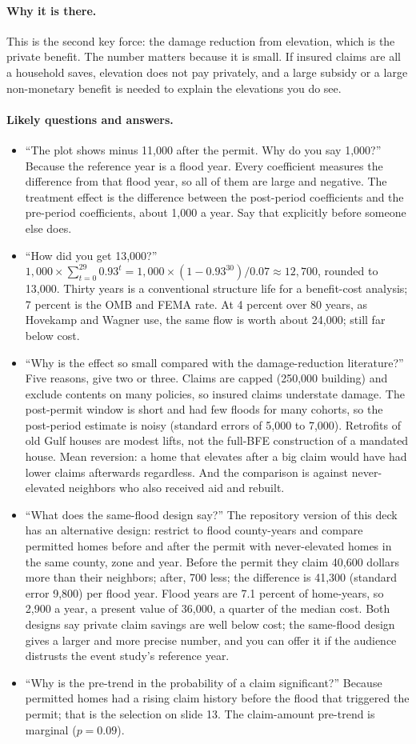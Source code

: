 \documentclass[11pt]{article}
\newcommand{\why}{\paragraph{Why it is there.}}
\newcommand{\qa}{\paragraph{Likely questions and answers.}}
\begin{document}
\why This is the second key force: the damage reduction from elevation, which is the private benefit. The number matters because it is small. If insured claims are all a household saves, elevation does not pay privately, and a large subsidy or a large non-monetary benefit is needed to explain the elevations you do see.

\qa
\begin{itemize}
\item ``The plot shows minus 11,000 after the permit. Why do you say 1,000?'' Because the reference year is a flood year. Every coefficient measures the difference from that flood year, so all of them are large and negative. The treatment effect is the difference between the post-period coefficients and the pre-period coefficients, about 1,000 a year. Say that explicitly before someone else does.
\item ``How did you get 13,000?'' $1{,}000 \times \sum_{t=0}^{29} 0.93^t = 1{,}000 \times (1-0.93^{30})/0.07 \approx 12{,}700$, rounded to 13,000. Thirty years is a conventional structure life for a benefit-cost analysis; 7 percent is the OMB and FEMA rate. At 4 percent over 80 years, as Hovekamp and Wagner use, the same flow is worth about 24,000; still far below cost.
\item ``Why is the effect so small compared with the damage-reduction literature?'' Five reasons, give two or three. Claims are capped (250,000 building) and exclude contents on many policies, so insured claims understate damage. The post-permit window is short and had few floods for many cohorts, so the post-period estimate is noisy (standard errors of 5,000 to 7,000). Retrofits of old Gulf houses are modest lifts, not the full-BFE construction of a mandated house. Mean reversion: a home that elevates after a big claim would have had lower claims afterwards regardless. And the comparison is against never-elevated neighbors who also received aid and rebuilt.
\item ``What does the same-flood design say?'' The repository version of this deck has an alternative design: restrict to flood county-years and compare permitted homes before and after the permit with never-elevated homes in the same county, zone and year. Before the permit they claim 40,600 dollars more than their neighbors; after, 700 less; the difference is 41,300 (standard error 9,800) per flood year. Flood years are 7.1 percent of home-years, so 2,900 a year, a present value of 36,000, a quarter of the median cost. Both designs say private claim savings are well below cost; the same-flood design gives a larger and more precise number, and you can offer it if the audience distrusts the event study's reference year.
\item ``Why is the pre-trend in the probability of a claim significant?'' Because permitted homes had a rising claim history before the flood that triggered the permit; that is the selection on slide 13. The claim-amount pre-trend is marginal ($p = 0.09$).
\end{itemize}
\end{document}
